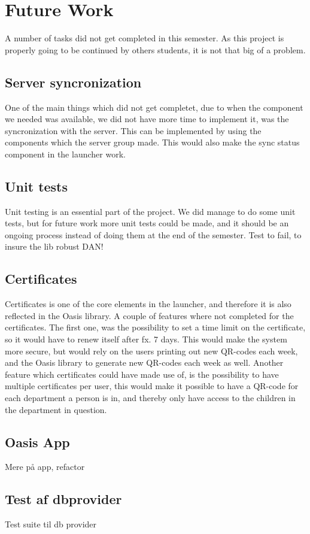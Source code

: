 \section{Future Work}

A number of tasks did not get completed in this semester. As this project is properly going to be continued by others students, it is not that big of a problem. 

\subsection{Server syncronization}
One of the main things which did not get completet, due to when the component we needed was available, we did not have more time to implement it, was the syncronization with the server. This can be implemented by using the components which the server group made. This would also make the sync status component in the launcher work.

\subsection{Unit tests}
Unit testing is an essential part of the project. We did manage to do some unit tests, but for future work more unit tests could be made, and it should be an ongoing process instead of doing them at the end of the semester.
Test to fail, to insure the lib robust DAN!

\subsection{Certificates}
Certificates is one of the core elements in the launcher, and therefore it is also reflected in the Oasis library. A couple of features where not completed for the certificates. The first one, was the possibility to set a time limit on the certificate, so it would have to renew itself after fx. 7 days. This would make the system more secure, but would rely on the users printing out new QR-codes each week, and the Oasis library to generate new QR-codes each week as well.
Another feature which certificates could have made use of, is the possibility to have multiple certificates per user, this would make it possible to have a QR-code for each department a person is in, and thereby only have access to the children in the department in question.

\subsection{Oasis App}

Mere p\aa{} app, refactor


\subsection{Test af dbprovider}
Test suite til db provider